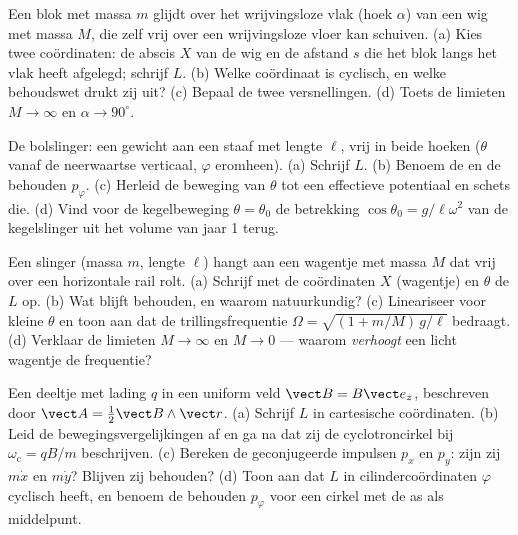\begin{exercise}[$\star\star$]\label{exo:b3:lagrangian-mechanics:5}
Een blok met massa $m$ glijdt over het wrijvingsloze vlak (hoek $\alpha$)
van een wig met massa $M$, die zelf vrij over een wrijvingsloze vloer kan
schuiven. (a) Kies twee coördinaten: de abscis $X$ van de wig en de
afstand $s$ die het blok langs het vlak heeft afgelegd; schrijf $L$.
(b) Welke coördinaat is cyclisch, en welke behoudswet drukt zij uit?
(c) Bepaal de twee versnellingen. (d) Toets de limieten $M \to \infty$ en
$\alpha \to
90^\circ$.
\end{exercise}

\begin{exercise}[$\star\star$]\label{exo:b3:lagrangian-mechanics:6}
De bolslinger: een gewicht aan een staaf met lengte $\ell$, vrij in beide
hoeken ($\theta$ vanaf de neerwaartse verticaal, $\varphi$ eromheen).
(a) Schrijf $L$. (b) Benoem de  en de behouden
$p_\varphi$. (c) Herleid de beweging van $\theta$ tot een effectieve
potentiaal en schets die. (d) Vind voor de kegelbeweging $\theta =
\theta_0$ de betrekking $\cos\theta_0 =
g/\ell\omega^2$ van de
kegelslinger uit het volume van jaar 1 terug.
\end{exercise}

\begin{exercise}[$\star\star$]\label{exo:b3:lagrangian-mechanics:7}
Een slinger (massa $m$, lengte $\ell$) hangt aan een wagentje met massa
$M$ dat vrij over een horizontale rail rolt. (a) Schrijf met de
coördinaten $X$ (wagentje) en $\theta$ de  $L$ op. (b) Wat
blijft behouden, en
waarom natuurkundig? (c) Lineariseer voor kleine $\theta$ en toon aan dat
de trillingsfrequentie $\Omega = \sqrt{(1 + m/M)\,g/\ell}$ bedraagt.
(d) Verklaar de limieten $M \to
\infty$ en $M \to 0$ --- waarom
\emph{verhoogt} een licht wagentje de frequentie?
\end{exercise}

\begin{exercise}[$\star\star$]\label{exo:b3:lagrangian-mechanics:8}
Een deeltje met lading $q$ in een uniform veld $\vect B = B\vect e_z$,
beschreven door $\vect A = \tfrac12\vect B\wedge\vect r$. (a) Schrijf $L$
in cartesische coördinaten. (b) Leid de bewegingsvergelijkingen af en ga
na dat zij de cyclotroncirkel bij $\omega_{\text{c}} = qB/m$ beschrijven.
(c) Bereken de geconjugeerde impulsen $p_x$ en $p_y$: zijn zij $m\dot x$
en $m\dot y$? Blijven zij behouden? (d) Toon aan dat $L$ in
cilindercoördinaten $\varphi$ cyclisch heeft, en benoem de behouden
$p_\varphi$ voor een cirkel met de as als middelpunt.
\end{exercise}

